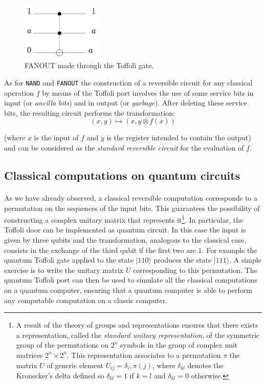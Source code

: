 \documentclass[a4paper,10pt]{article}
\begin{document}
\begin{figure}[!htb]
\begin{center}
\includegraphics[width=1.5in]{images/fanoutToffoli.png}
\caption{FANOUT made through the Toffoli gate.}
\label{fanoutToffoli}
\end{center}
\end{figure}

As for \texttt{NAND} and \texttt{FANOUT} the construction of a reversible circuit for any classical operation $f$ by means of the Toffoli port involves the use of some service bits in input (or \textit{ancilla bits}) and in output (or \textit{garbage}). After deleting these service bits, the resulting circuit performs the transformation:
$$(x, y) \mapsto (x, y \otimes f(x))$$

(where $x$ is the input of $f$ and $y$ is the register intended to contain the output) and can be considered as the \textit{standard reversible circuit} for the evaluation of $f$.

\subsection{Classical computations on quantum circuits}

\paragraph{} As we have already observed, a classical reversible computation corresponds to a permutation on the sequences of the input bits. This guarantees the possibility of constructing a complex unitary matrix that represents it\footnote{A result of the theory of groups and representations ensures that there exists a representation, called the \textit{standard unitary representation}, of the symmetric group of the permutations on $2^{n}$ symbols in the group of complex unit matrices $2^{n}\times2^{n}$. This representation associates to a permutation $\pi$ the matrix $U$ of generic element $U_{ij} = \delta_i, \pi(j)$, where $\delta_{kl}$ denotes the Kronecker's delta defined so $\delta_{kl} = 1$ if $k = l$ and $\delta_{kl} = 0$ otherwise.}. In particular, the Toffoli door can be implemented as quantum circuit. In this case the input is given by three qubits and the transformation, analogous to the classical case, consists in the exchange of the third qubit if the first two are $1$. For example the quantum Toffoli gate applied to the state $|110\rangle$ produces the state $|111\rangle$. A simple exercise is to write the unitary matrix $U$ corresponding to this permutation.
The quantum Toffoli port can then be used to simulate all the classical computations on a quantum computer, ensuring that a quantum computer is able to perform any computable computation on a classic computer.
\end{document}
